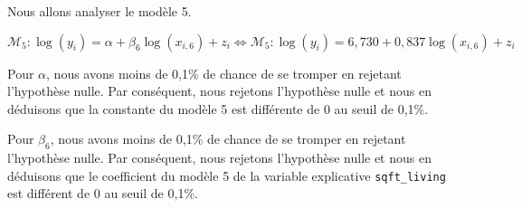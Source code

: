 \documentclass[
  11pt,
  french,
]{article}
\begin{document}
\begin{table}[!h]

\caption{\label{tab:unnamed-chunk-13}Comparaison des performances des régressions linéaires de l'analyse 1}
\centering
{}
\end{table}

Nous allons analyser le modèle 5.

\[\mathcal{M}_{5}:\log(y_{i})=\alpha+\beta_{6}\log(x_{i,6})+z_{i} \iff \mathcal{M}_{5}:\log(y_{i})=6,730+0,837\log(x_{i,6})+z_{i}\]

Pour \(\alpha\), nous avons moins de 0,1\% de chance de se tromper en
rejetant l'hypothèse nulle. Par conséquent, nous rejetons l'hypothèse
nulle et nous en déduisons que la constante du modèle 5 est différente
de 0 au seuil de 0,1\%.

Pour \(\beta_{6}\), nous avons moins de 0,1\% de chance de se tromper en
rejetant l'hypothèse nulle. Par conséquent, nous rejetons l'hypothèse
nulle et nous en déduisons que le coefficient du modèle 5 de la variable
explicative \texttt{sqft\_living} est différent de 0 au seuil de 0,1\%.
\end{document}
